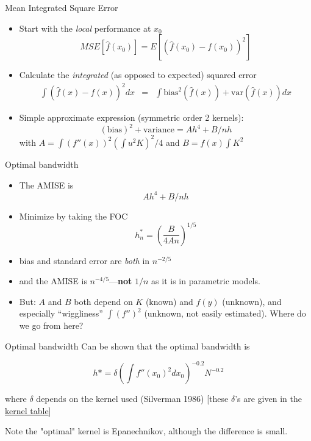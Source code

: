 \begin{frame}{Mean Integrated Square Error}
  \begin{itemize}
    \item Start with the \textit{local} performance at $x_0$
    $$ MSE \left[ \hat{f}(x_0) \right] = E \left[ \left( \hat{f}(x_0) - f(x_0) \right)^2 \right] $$
    \item Calculate the \textit{integrated} (as opposed to expected) squared error 
    \begin{align*}
      \int \left( {\hat f}(x)-f(x) \right)^2 dx &=& \int \mbox{bias} ^2 \left( {\hat f}(x) \right) + \mbox{var} \left( {\hat f}(x) \right) dx 
    \end{align*}

  \item Simple approximate expression (symmetric order 2 kernels): $$(\mbox{bias})^2+\mbox{variance}= A
  h^4+B/nh$$
  with $A=\int \left(f''(x)\right)^2 \left(\int u^2K\right)^2 /4$ and $B=f(x)\int K^2$

\end{itemize}  
\end{frame}

\begin{frame}{Optimal bandwidth}
  \begin{itemize}
  \item The AMISE is $$Ah^4+B/nh$$
  \item Minimize by taking the FOC 
    $$h^*_n=\left(\frac{B}{4An}\right)^{1/5}$$
  
  \item bias and standard error are \emph{both} in $n^{-2/5}$
  \item and the AMISE is $n^{-4/5}$---{\bf not} $1/n$ as it is in parametric models.
  
  \item But: $A$ and $B$ both depend on $K$ (known) and $f(y)$ (unknown), and
  especially ``wiggliness''
  $\int (f'')^2$ (unknown, not easily estimated). Where do we go from here? 
  \end{itemize}
\end{frame}

\begin{frame}{Optimal bandwidth}
  Can be shown that the optimal bandwidth is 
  
  $$h* = \delta \left( \int f''(x_0)^2dx_0\right)^{-0.2}N^{-0.2} $$

  where $\delta$ depends on the kernel used (Silverman 1986) [these $\delta$'s are given in the \href{fig:kernels}{kernel table}]

  Note the "optimal" kernel is Epanechnikov, although the difference is small. 

\end{frame}


